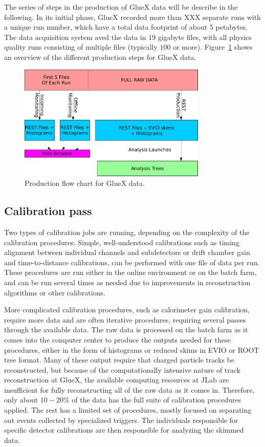 The series of steps in the production of GlueX data will be describe in the following. In its initial phase, GlueX recorded more than XXX separate runs with a unique run number, which have a total data footprint of about 5 petabytes. The data acquisition system aved the data in $19$ gigabyte files, with all physics quality runs consisting of multiple files (typically $100$ or more). Figure~\ref{fig:production_overview} shows an overview of the different production steps for GlueX data. 

\begin{figure}[h!]\centering
\includegraphics[width=0.8\textwidth]{figures/Production_generic.pdf}
\caption[]{\label{fig:production_overview}Production flow chart for GlueX data.} 
\end{figure}

\subsection{Calibration pass \label{sec:reccalibration}}

Two types of calibration jobs are running, depending on the complexity of the calibration procedures.  Simple, well-understood calibrations such as timing alignment between individual channels and subdetectors or drift chamber gain and time-to-distance calibrations, can be performed with one file of data per run.  These procedures are run either in the online environment or on the batch farm, and can be run several times as needed due to improvements in reconstruction algorithms or other calibrations.

More complicated calibration procedures, such as calorimeter gain calibration, require more data and are often iterative procedures, requiring several passes through the available data.  The raw data is processed on the batch farm as it comes into the computer center to produce the outputs needed for these procedures, either in the form of histograms or reduced skims in EVIO or ROOT tree format.  Many of these output require that charged particle tracks be reconstructed, but because of the computationally intensive nature of track reconstruction at GlueX, the available computing resources at JLab are insufficient for fully reconstructing all of the raw data as it comes in.  Therefore, only about $10-20$\% of the data has the full suite of calibration procedures applied.  The rest has a limited set of procedures, mostly focused on separating out events collected by specialized triggers. 
The individuals responsible for specific detector calibrations are then responsible for analyzing the skimmed data.

